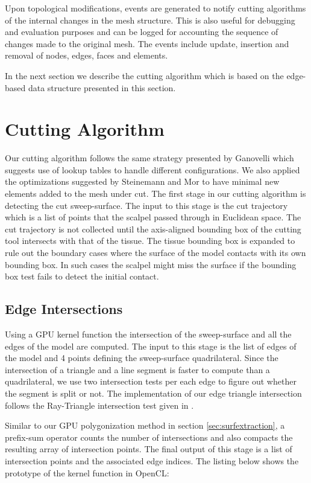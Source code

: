 Upon topological modifications, events are generated to notify cutting algorithms of the internal changes in the mesh structure. 
This is also useful for debugging and evaluation purposes and can be logged for accounting the sequence of changes made to the 
original mesh. The events include update, insertion and removal of nodes, edges, faces and elements.


In the next section we describe the cutting algorithm which is based on the edge-based data structure presented in this section.

\section{Cutting Algorithm}
\label{sec:cutalg}
Our cutting algorithm follows the same strategy presented by Ganovelli \etal \cite{Ganovelli2000} which suggests use of lookup tables to 
handle different configurations. We also applied the optimizations suggested by
Steinemann and Mor \etal \cite{Steinemann, Mor2000} to have minimal new elements added to the mesh under cut. 
The first stage in our cutting algorithm is detecting the cut sweep-surface. The input to this stage is the cut trajectory which is a list of points
that the scalpel passed through in Euclidean space. The cut trajectory is not collected until the axis-aligned bounding box of the cutting tool intersects
with that of the tissue. The tissue bounding box is expanded to rule out the boundary cases where the surface of the model contacts with its own bounding 
box. In such cases the scalpel might miss the surface if the bounding box test fails to detect the initial contact. 


\subsection{Edge Intersections}
Using a GPU kernel function the intersection of the sweep-surface and all the edges of the model are computed. 
The input to this stage is the list of edges of the model and 4 points defining the sweep-surface quadrilateral. 
Since the intersection of a triangle and a line segment is faster to compute than a quadrilateral, we 
use two intersection tests per each edge to figure out whether the segment is split or not. The implementation
of our edge triangle intersection follows the Ray-Triangle intersection test given in \cite{RTR3}.


Similar to our GPU polygonization method in section \ref{sec:surfextraction}, a prefix-sum operator counts the number
of intersections and also compacts the resulting array of intersection points. The final output of this stage is a list
of intersection points and the associated edge indices. The listing below shows the prototype of the kernel function in 
OpenCL:

